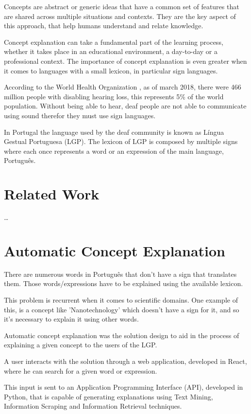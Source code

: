 \documentclass[runningheads]{llncs}
\begin{document}
Concepts are abstract or generic ideas that have a common set of features that are shared across multiple situations and contexts.
They are the key aspect of this approach, that help humans understand and relate knowledge.

Concept explanation can take a fundamental part of the learning process, whether it takes place in an educational environment, a day-to-day or a professional context.
The importance of concept explanation is even greater when it comes to languages with a small lexicon, in particular sign languages.

According to the World Health Organization \cite{who_2020}, as of march 2018, there were 466 million people with disabling hearing loss, this represents 5\% of the world population.
Without being able to hear, deaf people are not able to communicate using sound therefor they must use sign languages.

In Portugal the language used by the deaf community is known as Língua Gestual Portuguesa (LGP).
The lexicon of LGP is composed by multiple signs where each once represents a word or an expression of the main language, Português.

\section{Related Work}

\dots

\section{Automatic Concept Explanation}

There are numerous words in Português that don't have a sign that translates them.
Those words/expressions have to be explained using the available lexicon.

This problem is recurrent when it comes to scientific domains.
One example of this, is a concept like 'Nanotechnology' which doesn't have a sign for it, and so it's necessary to explain it using other words.

Automatic concept explanation was the solution design to aid in the process of explaining a given concept to the users of the LGP.

A user interacts with the solution through a web application, developed in React, where he can search for a given word or expression.

This input is sent to an Application Programming Interface (API), developed in Python, that is capable of generating explanations using Text Mining, Information Scraping and Information Retrieval techniques.
\end{document}
